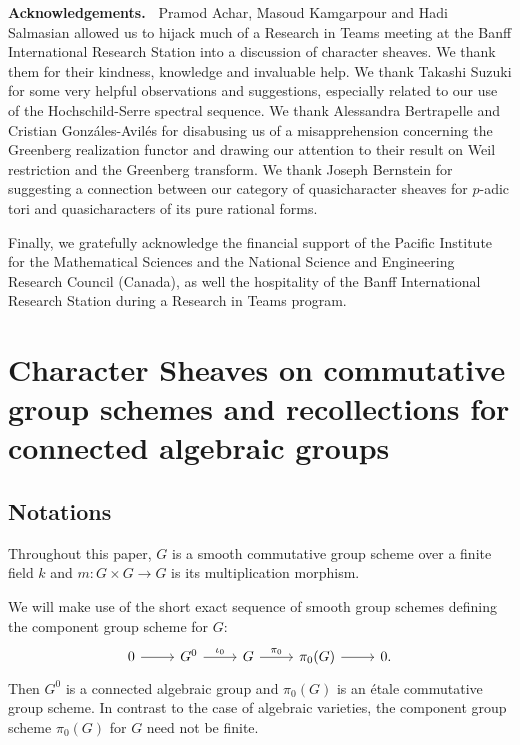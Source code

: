 \documentclass[10pt]{amsart}
\theoremstyle{plain}
\theoremstyle{definition}
\theoremstyle{remark}
\newcommand{\Fq}{k}
\begin{document}
\medskip
\noindent\textbf{Acknowledgements.\ } {Pramod Achar, Masoud Kamgarpour and Hadi Salmasian
allowed us to hijack much of a Research in Teams meeting at the Banff International Research Station into a discussion of
character sheaves.  We thank them for their kindness, knowledge and invaluable help.
We thank Takashi Suzuki for some very helpful observations and suggestions, especially related to our use of the Hochschild-Serre spectral sequence.
We thank Alessandra Bertrapelle and Cristian Gonz\'ales-Avil\'es for disabusing us of a misapprehension concerning the Greenberg realization functor and drawing our attention to their result on Weil restriction and the Greenberg transform.
We thank Joseph Bernstein for suggesting a connection between our category of quasicharacter sheaves for $p$-adic tori and quasicharacters of its pure rational forms.}

{Finally, we gratefully acknowledge the financial support of the Pacific Institute for the Mathematical Sciences and the National Science and Engineering Research Council (Canada), as well the hospitality of the Banff International Research Station during a Research in Teams program.}

\tableofcontents

\section{Character Sheaves on commutative group schemes and recollections for connected algebraic groups} \label{sec:category}

 
\subsection{Notations}\label{ssec:notation}

Throughout this paper, $G$ is a smooth commutative group scheme
over a finite field $\Fq$ and $m : G \times G\to G$ is its multiplication morphism.

We will make use of the short exact sequence of smooth group schemes defining the component group scheme for $G$:
\[
\begin{tikzcd}
0 \rar & G^0 \arrow{r}{\iota_0} & G \arrow{r}{\pi_0} & \pi_0(G) \rar & 0.
\end{tikzcd}
\]
Then $G^0$ is a connected algebraic group and $\pi_0(G)$ is an \'etale commutative group scheme.
In contrast to the case of algebraic varieties, the component group scheme $\pi_0(G)$ for $G$ need not be finite.
\end{document}
